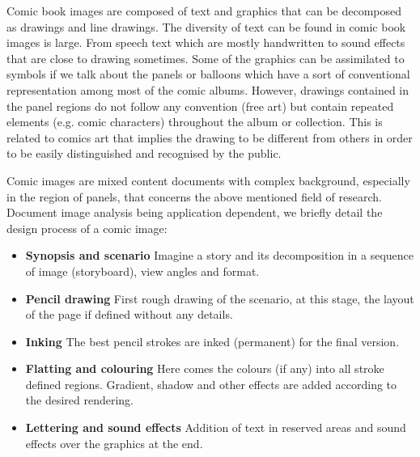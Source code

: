 
Comic book images are composed of text and graphics that can be decomposed as drawings and line drawings.
The diversity of text can be found in comic book images is large.
From speech text which are mostly handwritten to sound effects that are close to drawing sometimes.
Some of the graphics can be assimilated to symbols if we talk about the panels or balloons which have a sort of conventional representation among most of the comic albums.
However, drawings contained in the panel regions do not follow any convention (free art) but contain repeated elements (e.g. comic characters) throughout the album or collection.
This is related to comics art that implies the drawing to be different from others in order to be easily distinguished and recognised by the public.

Comic images are mixed content documents with complex background, especially in the region of panels, that concerns the above mentioned field of research.
Document image analysis being application dependent, we briefly detail the design process of a comic image:

\begin{itemize}
  \item \textbf{Synopsis and scenario} Imagine a story and its decomposition in a sequence of image (storyboard), view angles and format. 
  \item \textbf{Pencil drawing} First rough drawing of the scenario, at this stage, the layout of the page if defined without any details.
  \item \textbf{Inking} The best pencil strokes are inked (permanent) for the final version.
  \item \textbf{Flatting and colouring} Here comes the colours (if any) into all stroke defined regions. Gradient, shadow and other effects are added according to the desired rendering.
  \item \textbf{Lettering and sound effects} Addition of text in reserved areas and sound effects over the graphics at the end.
\end{itemize}

